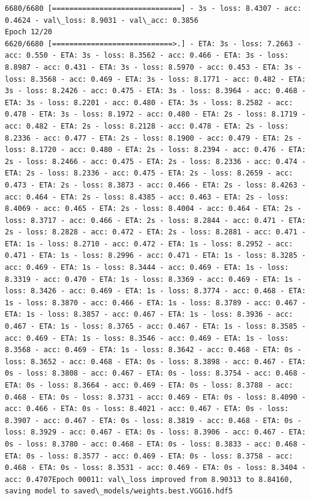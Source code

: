 \documentclass[11pt]{article}
\begin{document}
\begin{Verbatim}[commandchars=\\\{\}]
6680/6680 [==============================] - 3s - loss: 8.4307 - acc: 0.4624 - val\_loss: 8.9031 - val\_acc: 0.3856
Epoch 12/20
6620/6680 [============================>.] - ETA: 3s - loss: 7.2663 - acc: 0.550 - ETA: 3s - loss: 8.3562 - acc: 0.466 - ETA: 3s - loss: 8.8987 - acc: 0.431 - ETA: 3s - loss: 8.5970 - acc: 0.453 - ETA: 3s - loss: 8.3568 - acc: 0.469 - ETA: 3s - loss: 8.1771 - acc: 0.482 - ETA: 3s - loss: 8.2426 - acc: 0.475 - ETA: 3s - loss: 8.3964 - acc: 0.468 - ETA: 3s - loss: 8.2201 - acc: 0.480 - ETA: 3s - loss: 8.2582 - acc: 0.478 - ETA: 3s - loss: 8.1972 - acc: 0.480 - ETA: 2s - loss: 8.1719 - acc: 0.482 - ETA: 2s - loss: 8.2128 - acc: 0.478 - ETA: 2s - loss: 8.2336 - acc: 0.477 - ETA: 2s - loss: 8.1900 - acc: 0.479 - ETA: 2s - loss: 8.1720 - acc: 0.480 - ETA: 2s - loss: 8.2394 - acc: 0.476 - ETA: 2s - loss: 8.2466 - acc: 0.475 - ETA: 2s - loss: 8.2336 - acc: 0.474 - ETA: 2s - loss: 8.2336 - acc: 0.475 - ETA: 2s - loss: 8.2659 - acc: 0.473 - ETA: 2s - loss: 8.3873 - acc: 0.466 - ETA: 2s - loss: 8.4263 - acc: 0.464 - ETA: 2s - loss: 8.4385 - acc: 0.463 - ETA: 2s - loss: 8.4069 - acc: 0.465 - ETA: 2s - loss: 8.4004 - acc: 0.464 - ETA: 2s - loss: 8.3717 - acc: 0.466 - ETA: 2s - loss: 8.2844 - acc: 0.471 - ETA: 2s - loss: 8.2828 - acc: 0.472 - ETA: 2s - loss: 8.2881 - acc: 0.471 - ETA: 1s - loss: 8.2710 - acc: 0.472 - ETA: 1s - loss: 8.2952 - acc: 0.471 - ETA: 1s - loss: 8.2996 - acc: 0.471 - ETA: 1s - loss: 8.3285 - acc: 0.469 - ETA: 1s - loss: 8.3444 - acc: 0.469 - ETA: 1s - loss: 8.3319 - acc: 0.470 - ETA: 1s - loss: 8.3369 - acc: 0.469 - ETA: 1s - loss: 8.3426 - acc: 0.469 - ETA: 1s - loss: 8.3774 - acc: 0.468 - ETA: 1s - loss: 8.3870 - acc: 0.466 - ETA: 1s - loss: 8.3789 - acc: 0.467 - ETA: 1s - loss: 8.3857 - acc: 0.467 - ETA: 1s - loss: 8.3936 - acc: 0.467 - ETA: 1s - loss: 8.3765 - acc: 0.467 - ETA: 1s - loss: 8.3585 - acc: 0.469 - ETA: 1s - loss: 8.3546 - acc: 0.469 - ETA: 1s - loss: 8.3568 - acc: 0.469 - ETA: 1s - loss: 8.3642 - acc: 0.468 - ETA: 0s - loss: 8.3652 - acc: 0.468 - ETA: 0s - loss: 8.3898 - acc: 0.467 - ETA: 0s - loss: 8.3808 - acc: 0.467 - ETA: 0s - loss: 8.3754 - acc: 0.468 - ETA: 0s - loss: 8.3664 - acc: 0.469 - ETA: 0s - loss: 8.3788 - acc: 0.468 - ETA: 0s - loss: 8.3731 - acc: 0.469 - ETA: 0s - loss: 8.4090 - acc: 0.466 - ETA: 0s - loss: 8.4021 - acc: 0.467 - ETA: 0s - loss: 8.3907 - acc: 0.467 - ETA: 0s - loss: 8.3819 - acc: 0.468 - ETA: 0s - loss: 8.3929 - acc: 0.467 - ETA: 0s - loss: 8.3906 - acc: 0.467 - ETA: 0s - loss: 8.3780 - acc: 0.468 - ETA: 0s - loss: 8.3833 - acc: 0.468 - ETA: 0s - loss: 8.3577 - acc: 0.469 - ETA: 0s - loss: 8.3758 - acc: 0.468 - ETA: 0s - loss: 8.3531 - acc: 0.469 - ETA: 0s - loss: 8.3404 - acc: 0.4707Epoch 00011: val\_loss improved from 8.90313 to 8.84160, saving model to saved\_models/weights.best.VGG16.hdf5

\end{Verbatim}
\end{document}
